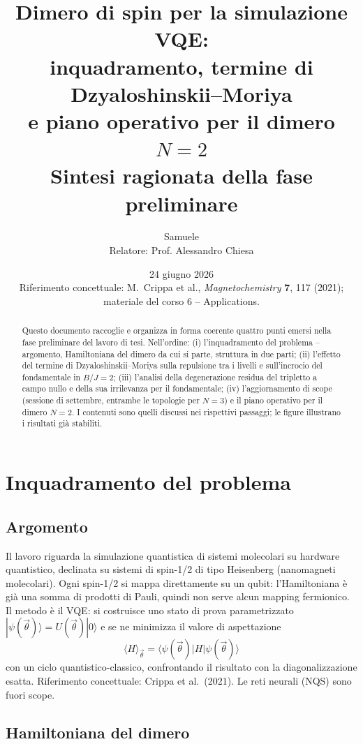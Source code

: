 \documentclass[11pt,a4paper]{article}
\title{Dimero di spin per la simulazione VQE:\\
inquadramento, termine di Dzyaloshinskii--Moriya\\
e piano operativo per il dimero $N=2$\\[6pt]
\large Sintesi ragionata della fase preliminare}
\author{Samuele \\ Relatore: Prof. Alessandro Chiesa}
\date{24 giugno 2026 \\ \small Riferimento concettuale: M.\ Crippa et al., \emph{Magnetochemistry} \textbf{7}, 117 (2021); materiale del corso 6 -- Applications.}
\begin{document}
\maketitle

\begin{abstract}
\noindent Questo documento raccoglie e organizza in forma coerente quattro punti emersi
nella fase preliminare del lavoro di tesi. Nell'ordine: (i) l'inquadramento del problema
-- argomento, Hamiltoniana del dimero da cui si parte, struttura in due parti; (ii)
l'effetto del termine di Dzyaloshinskii--Moriya sulla repulsione tra i livelli e
sull'incrocio del fondamentale in $B/J=2$; (iii) l'analisi della degenerazione residua
del tripletto a campo nullo e della sua irrilevanza per il fondamentale; (iv)
l'aggiornamento di scope (sessione di settembre, entrambe le topologie per $N=3$) e il
piano operativo per il dimero $N=2$. I contenuti sono quelli discussi nei rispettivi
passaggi; le figure illustrano i risultati gi\`a stabiliti.
\end{abstract}

\tableofcontents

\section{Inquadramento del problema}

\subsection{Argomento}

Il lavoro riguarda la simulazione quantistica di sistemi molecolari su hardware
quantistico, declinata su sistemi di spin-1/2 di tipo Heisenberg (nanomagneti
molecolari). Ogni spin-1/2 si mappa direttamente su un qubit: l'Hamiltoniana \`e gi\`a
una somma di prodotti di Pauli, quindi non serve alcun mapping fermionico. Il metodo
\`e il VQE: si costruisce uno stato di prova parametrizzato
$|\psi(\vec\theta)\rangle=U(\vec\theta)|0\rangle$ e se ne minimizza il valore di
aspettazione
$$\langle H\rangle_{\vec\theta} = \langle\psi(\vec\theta)|H|\psi(\vec\theta)\rangle$$
con un ciclo quantistico-classico, confrontando il risultato con la diagonalizzazione
esatta. Riferimento concettuale: Crippa et al.\ (2021). Le reti neurali (NQS) sono
fuori scope.

\subsection{Hamiltoniana del dimero}
\end{document}
